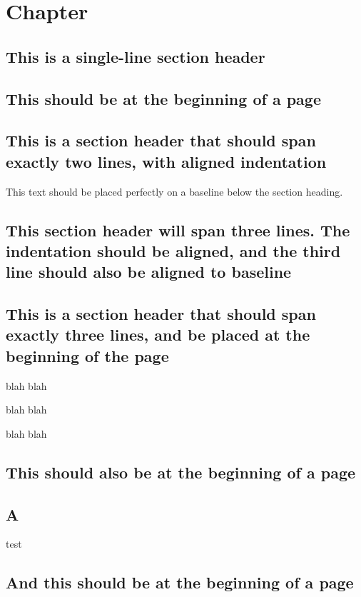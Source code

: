 \documentclass[baselinegrid]{uit-thesis-test}
\begin{document}
\mainmatter

\chapter{Chapter}
\lipsum[1]

\section{This is a single-line section header}
\lipsum[3-7]

\section{This should be at the beginning of a page}
\lipsum[8]

\section{This is a section header that should span exactly two lines, with aligned indentation}
This text should be placed perfectly on a baseline below the section heading.

\lipsum[9]

\section{This section header will span three lines. The indentation should be aligned, and the third line should also be aligned to baseline}
\lipsum[10-14]

\section{This is a section header that should span exactly three lines, and be placed at the beginning of the page}

\lipsum[15-17]

blah blah

blah blah

blah blah



\section{This should also be at the beginning of a page}
\section{A}
test

\newpage
\section{And this should be at the beginning of a page}
\end{document}
